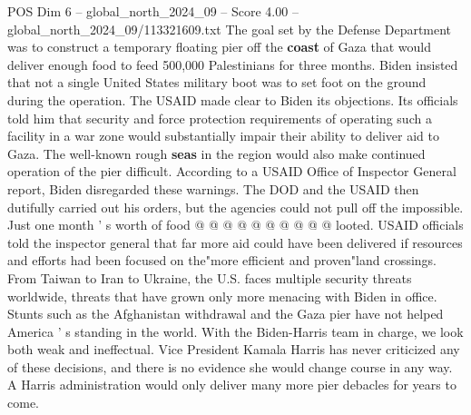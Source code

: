 \begin{textsample}{POS Dim 6 – global\_north\_2024\_09 – Score 4.00 – global\_north\_2024\_09/113321609.txt}
The goal set by the Defense Department was to construct a temporary floating pier off the \textbf{coast} of Gaza that would deliver enough food to feed 500,000 Palestinians for three months.
Biden insisted that not a single United States military boot was to set foot on the ground during the operation.
The USAID made clear to Biden its objections.
Its officials told him that security and force protection requirements of operating such a facility in a war zone would substantially impair their ability to deliver aid to Gaza.
The well-known rough \textbf{seas} in the region would also make continued operation of the pier difficult.
According to a USAID Office of Inspector General report, Biden disregarded these warnings.
The DOD and the USAID then dutifully carried out his orders, but the agencies could not pull off the impossible.
Just one month ' s worth of food @ @ @ @ @ @ @ @ @ @ looted.
USAID officials told the inspector general that far more aid could have been delivered if resources and efforts had been focused on the"more efficient and proven"land crossings.
From Taiwan to Iran to Ukraine, the U.S. faces multiple security threats worldwide, threats that have grown only more menacing with Biden in office.
Stunts such as the Afghanistan withdrawal and the Gaza pier have not helped America ' s standing in the world.
With the Biden-Harris team in charge, we look both weak and ineffectual.
Vice President Kamala Harris has never criticized any of these decisions, and there is no evidence she would change course in any way.
A Harris administration would only deliver many more pier debacles for years to come.

\end{textsample}
